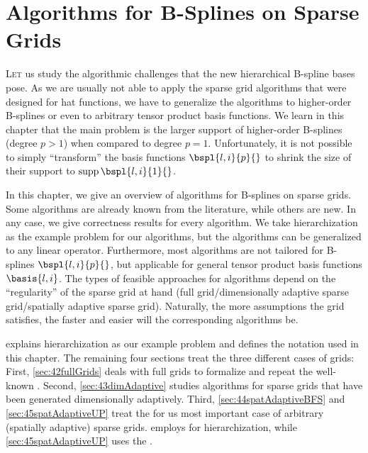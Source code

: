 
\chapter{Algorithms for B-Splines on Sparse Grids}


\lettrine{L}{et}
us study the algorithmic challenges that the new hierarchical B-spline
bases pose.
As we are usually not able to apply the sparse grid algorithms
that were designed for hat functions, we have to generalize the algorithms
to higher-order B-splines or even to arbitrary tensor product basis functions.
We learn in this chapter that the main problem is the larger support
of higher-order B-splines (degree $p > 1$) when compared to degree $p = 1$.
Unfortunately, it is not possible to simply ``transform'' the basis
functions $\bspl{l,i}{p}{}$ to shrink the size of their support
to $\supp \bspl{l,i}{1}{}$.

In this chapter, we give an overview of algorithms for B-splines
on sparse grids.
Some algorithms are already known from the literature,
while others are new.
In any case, we give correctness results for every algorithm.
We take hierarchization as the example problem for our algorithms,
but the algorithms can be generalized to any linear operator.
Furthermore, most algorithms are not tailored for B-splines $\bspl{l,i}{p}{}$,
but applicable for general tensor product basis functions $\basis{l,i}$.
The types of feasible approaches for algorithms
depend on the ``regularity'' of the sparse grid at hand
(full grid/dimensionally adaptive sparse grid/spatially adaptive sparse grid).
Naturally, the more assumptions the grid satisfies, the faster and
easier will the corresponding algorithms be.

 explains hierarchization as our example problem
and defines the notation used in this chapter.
The remaining four sections treat the three different cases of grids:
First, \cref{sec:42fullGrids} deals with full grids to formalize and repeat
the well-known \up.
Second, \cref{sec:43dimAdaptive} studies algorithms for
sparse grids that have been generated dimensionally adaptively.
Third, \cref{sec:44spatAdaptiveBFS} and \cref{sec:45spatAdaptiveUP}
treat the for us most important case
of arbitrary (spatially adaptive) sparse grids.
 employs \bfs for hierarchization,
while \cref{sec:45spatAdaptiveUP} uses the \up.

